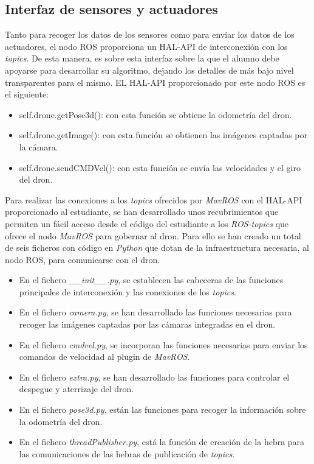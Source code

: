 \subsection{Interfaz de sensores y actuadores}
Tanto para recoger los datos de los sensores como para enviar los datos de los actuadores, el nodo ROS proporciona un HAL-API de interconexión con los \textit{topics}. De esta manera, es sobre esta interfaz sobre la que el alumno debe apoyarse para desarrollar su algoritmo, dejando los detalles de más bajo nivel transparentes para el mismo. EL HAL-API proporcionado por este nodo ROS es el siguiente:
\begin{itemize}
    \item self.drone.getPose3d(): con esta función se obtiene la odometría del dron.
    \item self.drone.getImage(): con esta función se obtienen las imágenes captadas por la cámara.
    \item self.drone.sendCMDVel(): con esta función se envía las velocidades y el giro del dron.
\end{itemize}

Para realizar las conexiones a los \textit{topics} ofrecidos por \textit{MavROS} con el HAL-API proporcionado al estudiante, se han desarrollado unos recubrimientos que permiten un fácil acceso desde el código del estudiante a los \textit{ROS-topics} que ofrece el nodo \textit{MavROS} para gobernar al dron. Para ello se han creado un total de seis ficheros con código en \textit{Python} que dotan de la infraestructura necesaria, al nodo ROS, para comunicarse con el dron.

\begin{itemize}
    \item En el fichero \textit{\_\_init\_\_.py}, se establecen las cabeceras de las funciones principales de interconexión y las conexiones de los \textit{topics}.
    \item En el fichero \textit{camera.py}, se han desarrollado las funciones necesarias para recoger las imágenes captadas por las cámaras integradas en el dron.
    \item En el fichero \textit{cmdvel.py}, se incorporan las funciones necesarias para enviar los comandos de velocidad al plugin de \textit{MavROS}.
    \item En el fichero \textit{extra.py}, se han desarrollado las funciones para controlar el despegue y aterrizaje del dron.
    \item En el fichero \textit{pose3d.py}, están las funciones para recoger la información sobre la odometría del dron.
    \item En el fichero \textit{threadPublisher.py}, está la función de creación de la hebra para las comunicaciones de las hebras de publicación de \textit{topics}.
\end{itemize}

